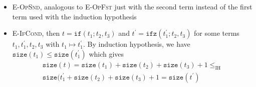 \documentclass{article}
\begin{document}
\begin{itemize}
\item \textsc{E-OpSnd}, analogous to \textsc{E-OpFst} just with the second term instead of the first term used with the induction hypothesis 
\item \textsc{E-IfCond}, then $t = \mathtt{if}(t_1;t_2,t_3)$ and $t^{\prime} = \mathtt{ifz}(t_1^{\prime};t_2,t_3)$ for some terms $t_1,t_1^{\prime},t_2,t_3$ with $t_1\mapsto t_1^{\prime}$. By induction hypothesis, we have $\mathtt{size}(t_1) \leq \mathtt{size}(t_1^{\prime})$ which gives 
  \begin{align*}
    \mathtt{size}(t) = \mathtt{size}(t_1) + \mathtt{size}(t_2) + \mathtt{size}(t_3) + 1\leq_{\text{IH}}\\
    \mathtt{size}(t_1^{\prime} + \mathtt{size}(t_2) + \mathtt{size}(t_3) + 1 = \mathtt{size}(t^{\prime})
  \end{align*}
\end{itemize}
\end{document}
